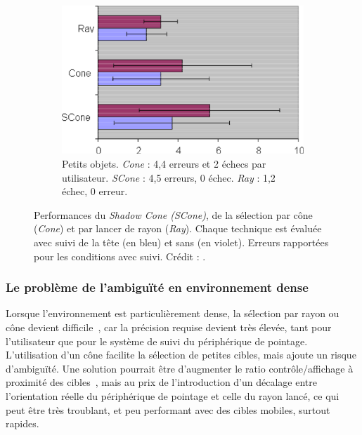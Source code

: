 \begin{figure}[!htbp]
\begin{subfigure}[t]{\subImgWmo}
			\centering
			\includegraphics[width=\textwidth]{figures/ch2/shadowCSmall}
			\caption{Petits objets. \emph{Cone} : 4,4 erreurs et 2 échecs par utilisateur. \emph{SCone} : 4,5 erreurs, 0 échec. \emph{Ray} : 1,2 échec, 0 erreur.}
			\label{fig:shadowCSmall}
		\end{subfigure}
		\caption[Performances du \emph{Shadow Cone}]{Performances du \emph{Shadow Cone (SCone)}, de la sélection par cône (\emph{Cone}) et par lancer de rayon (\emph{Ray}). Chaque technique est évaluée avec suivi de la tête (en bleu) et sans (en violet). Erreurs rapportées pour les conditions avec suivi. Crédit : \cite{steed20043d}.}
		\label{fig:shadowConePerf}
	\end{figure}
	
	\subsubsection{Le problème de l'ambiguïté en environnement dense}
	Lorsque l'environnement est particulièrement dense, la sélection par rayon ou cône devient difficile~\cite{kopper2011rapid}, car la précision requise devient très élevée, tant pour l'utilisateur que pour le système de suivi du périphérique de pointage. L'utilisation d'un cône facilite la sélection de petites cibles, mais ajoute un risque d'ambiguïté. Une solution pourrait être d'augmenter le ratio contrôle/affichage à proximité des cibles~\cite{frees2007prism, kopper2010human}, mais au prix de l'introduction d'un décalage entre l'orientation réelle du périphérique de pointage et celle du rayon lancé, ce qui peut être très troublant, et peu performant avec des cibles mobiles, surtout rapides.
	
